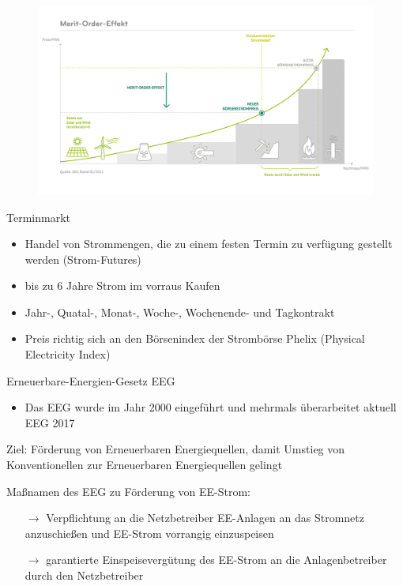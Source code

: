 \documentclass[aspectratio=1610, professionalfonts, 9pt]{beamer}
\begin{document}
{
\begin{frame}
  \begin{figure}
  \includegraphics[width=1\textwidth]{images/Merit.png}
\end{figure}
\end{frame}
}

\begin{frame}{Terminmarkt}
\begin{itemize}
  \item Handel von Strommengen, die zu einem festen Termin zu verfügung gestellt werden (Strom-Futures)
  \item bis zu 6 Jahre Strom im vorraus Kaufen
  \item Jahr-, Quatal-, Monat-, Woche-,  Wochenende- und Tagkontrakt
  \item Preis richtig sich an den Börsenindex der Strombörse Phelix (Physical Electricity Index)
\end{itemize}
\end{frame}

\begin{frame}{Erneuerbare-Energien-Gesetz EEG}
   \begin{itemize}
     \item Das EEG wurde im Jahr 2000 eingeführt und mehrmals überarbeitet aktuell EEG 2017
   \end{itemize}
\pause
    \begin{block}{Ziel:}
      Förderung von Erneuerbaren Energiequellen, damit Umstieg von Konventionellen zur Erneuerbaren Energiequellen gelingt
    \end{block}
\pause
    \begin{block}{Maßnamen des EEG zu Förderung von EE-Strom:}
     \begin{itemize}
       \item[$\rightarrow$] Verpflichtung an die Netzbetreiber EE-Anlagen an das Stromnetz anzuschießen und EE-Strom vorrangig einzuspeisen
       \item[$\rightarrow$] garantierte Einspeisevergütung des EE-Strom an die Anlagenbetreiber durch den Netzbetreiber
   \end{itemize}
   \end{block}
\end{frame}
\end{document}

